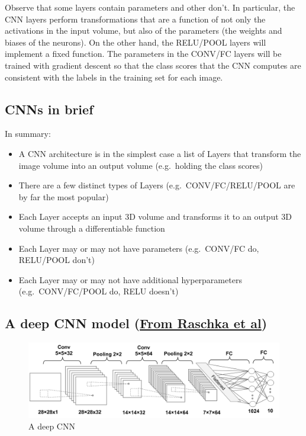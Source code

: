 \documentclass[%
oneside,                 %
final,                   %
10pt]{article}
\begin{document}
Observe that some layers contain
parameters and other don’t. In particular, the CNN layers perform
transformations that are a function of not only the activations in the
input volume, but also of the parameters (the weights and biases of
the neurons). On the other hand, the RELU/POOL layers will implement a
fixed function. The parameters in the CONV/FC layers will be trained
with gradient descent so that the class scores that the CNN computes
are consistent with the labels in the training set for each image.

\subsection{CNNs in brief}

In summary:

\begin{itemize}
\item A CNN architecture is in the simplest case a list of Layers that transform the image volume into an output volume (e.g.~holding the class scores)

\item There are a few distinct types of Layers (e.g.~CONV/FC/RELU/POOL are by far the most popular)

\item Each Layer accepts an input 3D volume and transforms it to an output 3D volume through a differentiable function

\item Each Layer may or may not have parameters (e.g.~CONV/FC do, RELU/POOL don’t)

\item Each Layer may or may not have additional hyperparameters (e.g.~CONV/FC/POOL do, RELU doesn’t)
\end{itemize}

\noindent
\subsection{A deep CNN model (\href{{https://github.com/rasbt/machine-learning-book}}{From Raschka et al})}

\begin{figure}[!ht]  %
  \centerline{\includegraphics[width=0.67\linewidth]{figslides/deepcnn.png}}
  \caption{
  A deep CNN
  }
\end{figure}
\end{document}
